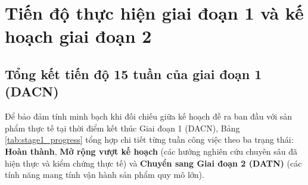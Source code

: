 \section{Tiến độ thực hiện giai đoạn 1 và kế hoạch giai đoạn 2}

\subsection{Tổng kết tiến độ 15 tuần của giai đoạn 1 (DACN)}
Để bảo đảm tính minh bạch khi đối chiếu giữa kế hoạch đề ra ban đầu với sản phẩm thực tế tại thời điểm kết thúc Giai đoạn 1 (DACN), Bảng \ref{tab:stage1_progress} tổng hợp chi tiết từng tuần công việc theo ba trạng thái: \textbf{Hoàn thành}, \textbf{Mở rộng vượt kế hoạch} (các hướng nghiên cứu chuyên sâu đã hiện thực và kiểm chứng thực tế) và \textbf{Chuyển sang Giai đoạn 2 (DATN)} (các tính năng mang tính vận hành sản phẩm quy mô lớn).

